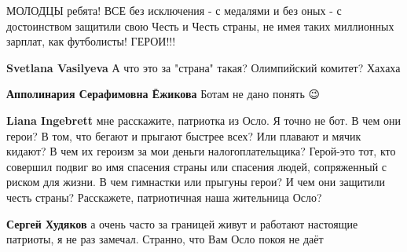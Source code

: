 \begin{itemize}
МОЛОДЦЫ ребята! ВСЕ без исключения - с медалями и без оных - с достоинством
защитили свою Честь и Честь страны, не имея таких миллионных зарплат, как
футболисты! ГЕРОИ!!!🎉🎉🎉🎉🎉

\begin{itemize}
 
\textbf{Svetlana Vasilyeva} А что это за "страна" такая? Олимпийский комитет? \Smiley[1.0][yellow] Хахаха

 
\textbf{Апполинария Серафимовна Ёжикова} Ботам не дано понять 😉

 
\textbf{Liana Ingebrett} мне расскажите, патриотка из Осло. Я точно не бот. В
чем они герои? В том, что бегают и прыгают быстрее всех? Или плавают и мячик
кидают? В чем их героизм за мои деньги налогоплательщика? Герой-это тот, кто
совершил подвиг во имя спасения страны или спасения людей, сопряженный с риском
для жизни. В чем гимнастки или прыгуны герои? И чем они защитили честь страны?
Расскажете, патриотичная наша жительница Осло?

 
\textbf{Сергей Худяков} а очень часто за границей живут и работают настоящие патриоты, я не раз замечал. Странно, что Вам Осло покоя не даёт

 

\end{itemize}
\end{itemize}
